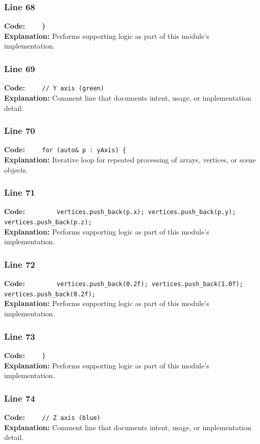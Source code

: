 \documentclass[11pt,a4paper]{article}
\begin{document}
\subsubsection*{Line 68}
\textbf{Code:} \verb|    }|\\
\textbf{Explanation:} Performs supporting logic as part of this module's implementation.

\subsubsection*{Line 69}
\textbf{Code:} \verb|    // Y axis (green)|\\
\textbf{Explanation:} Comment line that documents intent, usage, or implementation detail.

\subsubsection*{Line 70}
\textbf{Code:} \verb|    for (auto& p : yAxis) {|\\
\textbf{Explanation:} Iterative loop for repeated processing of arrays, vertices, or scene objects.

\subsubsection*{Line 71}
\textbf{Code:} \verb|        vertices.push_back(p.x); vertices.push_back(p.y); vertices.push_back(p.z);|\\
\textbf{Explanation:} Performs supporting logic as part of this module's implementation.

\subsubsection*{Line 72}
\textbf{Code:} \verb|        vertices.push_back(0.2f); vertices.push_back(1.0f); vertices.push_back(0.2f);|\\
\textbf{Explanation:} Performs supporting logic as part of this module's implementation.

\subsubsection*{Line 73}
\textbf{Code:} \verb|    }|\\
\textbf{Explanation:} Performs supporting logic as part of this module's implementation.

\subsubsection*{Line 74}
\textbf{Code:} \verb|    // Z axis (blue)|\\
\textbf{Explanation:} Comment line that documents intent, usage, or implementation detail.
\end{document}
